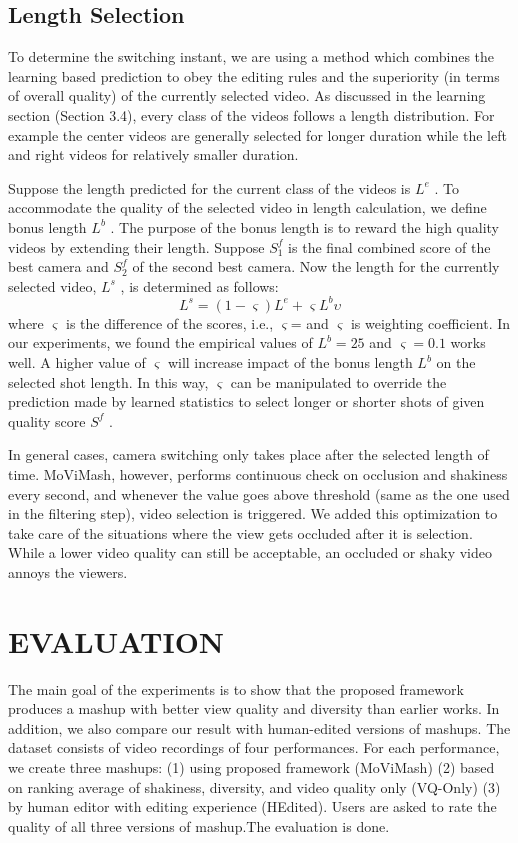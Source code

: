\documentclass{sig-alternate-05-2015}
\begin{document}
\subsection{Length Selection}
To determine the switching instant, we are using a method which
combines the learning based prediction to obey the editing rules and
the superiority (in terms of overall quality) of the currently selected
video. As discussed in the learning section (Section 3.4), every
class of the videos follows a length distribution. For example the
center videos are generally selected for longer duration while the
left and right videos for relatively smaller duration.

Suppose the length predicted for the current class of the videos
is $L^e$ . To accommodate the quality of the selected video in length
calculation, we define bonus length $L^b$ . The purpose of the bonus
length is to reward the high quality videos by extending their length.
Suppose $S_1^f$ is the final combined score of the best camera and $S_2^f$
of the second best camera. Now the length for the currently selected
video, $L^s$ , is determined as follows:
\begin{equation}
L^s=(1 -\varsigma )L^e + \varsigma L^b\upsilon
\end{equation}
where $\varsigma$ is the difference of the scores, i.e., $\varsigma $=
and $\varsigma$ is
weighting coefficient. In our experiments, we found the empirical
values of $L^b = 25$ and $\varsigma = 0.1$ works well. A higher value of
$\varsigma$ will increase impact of the bonus length $L^b$ on the selected shot
length. In this way, $\varsigma $ can be manipulated to override the prediction
made by learned statistics to select longer or shorter shots of given
quality score $S^f$ .


In general cases, camera switching only takes place after the selected length of time. MoViMash, however, performs continuous
check on occlusion and shakiness every second, and whenever the
value goes above threshold (same as the one used in the filtering
step), video selection is triggered. We added this optimization to
take care of the situations where the view gets occluded after it is
selection. While a lower video quality can still be acceptable, an
occluded or shaky video annoys the viewers.

\section{EVALUATION}
The main goal of the experiments is to show that the proposed
framework produces a mashup with better view quality and diversity than earlier works. In addition, we also compare our result with
human-edited versions of mashups. The dataset consists of video
recordings of four performances. For each performance, we create three mashups: (1) using proposed framework (MoViMash) (2)
based on ranking average of shakiness, diversity, and video quality only (VQ-Only) (3) by human editor with editing experience (HEdited). Users are asked to rate the quality of all three versions of
mashup.The evaluation is done.
\end{document}
